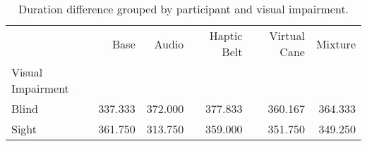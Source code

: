 
\begin{table}[!htb]
\centering
\caption{Duration difference grouped by participant and visual impairment.}
\label{tab:duracao_average_group}
\begin{tabular}{lrrrrr}
\toprule
{} &    Base &   Audio &  Haptic Belt &  Virtual Cane &  Mixture \\
Visual Impairment &         &         &              &               &          \\
\midrule
Blind             & 337.333 & 372.000 &      377.833 &       360.167 &  364.333 \\
Sight             & 361.750 & 313.750 &      359.000 &       351.750 &  349.250 \\
\bottomrule
\end{tabular}
\end{table}

